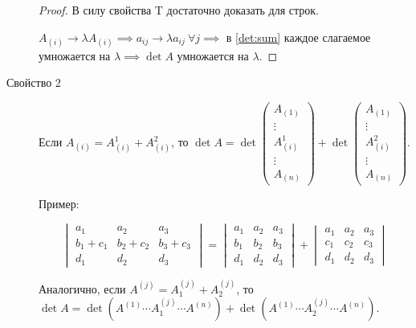 \begin{description}
    \begin{proof}
        В силу свойства T достаточно доказать для строк.

        $A_{(i)} \to \lambda A_{(i)} \implies a_{ij} \to \lambda a_{ij} \ \forall j \implies $ в \eqref{det:sum} каждое слагаемое умножается на $\lambda \implies \det A$ умножается на $\lambda$.
    \end{proof}

\item[Свойство 2]
    Если $A_{(i)} = A_{(i)}^1 + A_{(i)}^2$, то $\det A = \det \begin{pmatrix}
        A_{(1)} \\ \vdots \\ A_{(i)}^1 \\ \vdots \\ A_{(n)}
    \end{pmatrix} + \det \begin{pmatrix}
        A_{(1)} \\ \vdots \\ A_{(i)}^2 \\ \vdots \\ A_{(n)}
    \end{pmatrix}$.

    \bigskip
    Пример:

    \begin{equation*}
        \begin{vmatrix}
            a_1 & a_2 & a_3 \\
            b_1 + c_1 & b_2 + c_2 & b_3 + c_3 \\
            d_1 & d_2 & d_3
        \end{vmatrix} = \begin{vmatrix}
            a_1 & a_2 & a_3 \\
            b_1 & b_2 & b_3 \\
            d_1 & d_2 & d_3
        \end{vmatrix} + \begin{vmatrix}
            a_1 & a_2 & a_3 \\
            c_1 & c_2 & c_3 \\
            d_1 & d_2 & d_3
        \end{vmatrix}
    \end{equation*}

    Аналогично, если $A^{(j)} = A^{(j)}_1 + A^{(j)}_2$, то $\det A = \det (A^{(1)} \cdots A^{(j)}_1 \cdots A^{(n)}) + \det (A^{(1)} \cdots A^{(j)}_2 \cdots A^{(n)})$.


\end{description}
